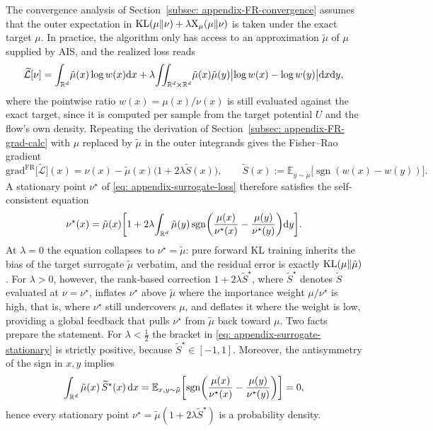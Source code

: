 \documentclass{article}
\begin{document}
The convergence analysis of Section~\ref{subsec: appendix-FR-convergence} assumes that the outer expectation in $\mathrm{KL}(\mu\|\nu) + \lambda \mathrm{X}_\mu(\mu\|\nu)$ is taken under the exact target $\mu$. In practice, the algorithm only has access to an approximation $\tilde\mu$ of $\mu$ supplied by AIS, and the realized loss reads
\begin{equation}
    \widetilde{\mathcal L}[\nu]
    = \int_{\mathbb R^d}\!\tilde\mu(x)\log w(x)\mathrm{d} x
    + \lambda\!\iint_{\mathbb R^d\times\mathbb R^d}\!\tilde\mu(x)\tilde\mu(y)\bigl|\log w(x) - \log w(y)\bigr|\mathrm{d} x\mathrm{d} y,
    \label{eq: appendix-surrogate-loss}
\end{equation}
where the pointwise ratio $w(x) = \mu(x)/\nu(x)$ is still evaluated against the exact target, since it is computed per sample from the target potential $U$ and the flow's own density. Repeating the derivation of Section~\ref{subsec: appendix-FR-grad-calc} with $\mu$ replaced by $\tilde\mu$ in the outer integrands gives the Fisher--Rao gradient
\begin{equation*}
    \mathrm{grad}^{\mathrm{FR}}\bigl[\widetilde{\mathcal L}\bigr](x) = \nu(x) - \tilde\mu(x)\bigl(1 + 2\lambda \widetilde S(x)\bigr),
    \qquad
    \widetilde S(x) := \mathbb E_{y\sim\tilde\mu}\bigl[\operatorname{sgn}(w(x) - w(y))\bigr].
\end{equation*}
A stationary point $\nu^\star$ of \eqref{eq: appendix-surrogate-loss} therefore satisfies the self-consistent equation
\begin{equation}
    \nu^\star(x) = \tilde\mu(x)\biggl[1 + 2\lambda\!\int_{\mathbb R^d}\tilde\mu(y)\operatorname{sgn}\biggl(\frac{\mu(x)}{\nu^\star(x)} - \frac{\mu(y)}{\nu^\star(y)}\biggr)\mathrm{d} y\biggr].
    \label{eq: appendix-surrogate-stationary}
\end{equation}
At $\lambda = 0$ the equation collapses to $\nu^\star = \tilde\mu$: pure forward KL training inherits the bias of the target surrogate $\tilde\mu$ verbatim, and the residual error is exactly $\mathrm{KL}(\mu\|\tilde\mu)$. For $\lambda > 0$, however, the rank-based correction $1 + 2\lambda\widetilde S^\star$, where $\widetilde S^\star$ denotes $\widetilde S$ evaluated at $\nu = \nu^\star$, inflates $\nu^\star$ above $\tilde\mu$ where the importance weight $\mu/\nu^\star$ is high, that is, where $\nu^\star$ still undercovers $\mu$, and deflates it where the weight is low, providing a global feedback that pulls $\nu^\star$ from $\tilde\mu$ back toward $\mu$. Two facts prepare the statement. For $\lambda < \frac12$ the bracket in \eqref{eq: appendix-surrogate-stationary} is strictly positive, because $\widetilde S^\star \in [-1, 1]$. Moreover, the antisymmetry of the sign in $x, y$ implies
\begin{equation*}
    \int_{\mathbb R^d} \tilde\mu(x)\, \widetilde S^\star(x)\, \mathrm{d} x
    = \mathbb E_{x, y \sim \tilde\mu}\biggl[\operatorname{sgn}\biggl(\frac{\mu(x)}{\nu^\star(x)} - \frac{\mu(y)}{\nu^\star(y)}\biggr)\biggr] = 0,
\end{equation*}
hence every stationary point $\nu^\star = \tilde\mu(1 + 2\lambda \widetilde S^\star)$ is a probability density.
\end{document}
